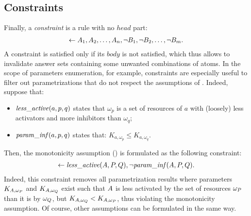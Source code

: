 \begin{example}\label{ex:cardinality}
%
\end{example}



\subsection{Constraints}\label{sssec:constraints}
Finally, a \emph{constraint} is a rule with no $head$ part:
\begin{align*}
  \leftarrow A_1, A_2, \dots, A_n, \neg B_1, \neg B_2, \dots, \neg B_m.
\end{align*}
A constraint is satisfied only if its $body$ is not satisfied,
which thus allows to invalidate answer sets containing some unwanted combinations of atoms.
In the scope of parameters enumeration, for example, constraints are especially useful
to filter out parametrizations that do not respect the assumptions of .
Indeed, suppose that:
\begin{itemize}
  \item $\mathit{less\_active}(a, p, q)$ states that $\omega_p$ is a set of resources of $a$ with (loosely) less activators and more inhibitors than $\omega_q$;
  \item $\mathit{param\_inf}(a, p, q)$ states that: $K_{a,\omega_p} \leq K_{a,\omega_q}$.
\end{itemize}
Then, the monotonicity assumption () is formulated as the following constraint:
\begin{align*}
  \leftarrow \mathit{less\_active}(A, P, Q), \neg \mathit{param\_inf}(A, P, Q).
\end{align*}
Indeed, this constraint removes all parametrization results where parameters $K_{A,\omega_P}$ and $K_{A,\omega_Q}$ exist
such that $A$ is less activated by the set of resources $\omega_P$ than it is by $\omega_Q$,
but $K_{A,\omega_Q} < K_{A,\omega_P}$,
thus violating the monotonicity assumption.
Of course, other assumptions can be formulated in the same way.

